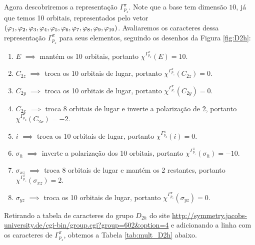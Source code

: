 \documentclass[a4paper,10pt]{article}
\newcommand{\mchi}{\chi^{\Gamma^\pi_{p_z}}}
\begin{document}
Agora descobriremos a representação $\Gamma^\pi_{p_z}$. Note que a base tem dimensão $10$, já que temos 10 orbitais, representados pelo vetor $(\varphi_1, \varphi_2, \varphi_3, \varphi_4, \varphi_5, \varphi_6, \varphi_7, \varphi_8, \varphi_9, \varphi_{10})$. Avaliaremos os caracteres dessa representação $\Gamma^\pi_{p_z}$ para seus elementos, seguindo os desenhos da Figura \ref{fig:D2h}:
\begin{enumerate}
\item $E$ $\implies$ mantém os 10 orbitais, portanto $\mchi(E) = 10$.
\item $C_{2z}$ $\implies$ troca os 10 orbitais de lugar, portanto $\mchi(C_{2z}) = 0$.
\item $C_{2y}$ $\implies$ troca os 10 orbitais de lugar, portanto $\mchi(C_{2y}) = 0$.
\item $C_{2x}$ $\implies$ troca 8 orbitais de lugar e inverte a polarização de 2, portanto $\mchi(C_{2x}) = -2$.
\item $i$ $\implies$ troca os 10 orbitais de lugar, portanto $\mchi(i) = 0$.
\item $\sigma_{h}$ $\implies$ inverte a polarização dos 10 orbitais, portanto $\mchi(\sigma_{h}) = -10$.
\item $\sigma_{xz}$ $\implies$ troca 8 orbitais de lugar e mantém os 2 restantes, portanto $\mchi(\sigma_{xz}) = 2$.
\item $\sigma_{yz}$ $\implies$ troca os 10 orbitais de lugar, portanto $\mchi(\sigma_{yz}) = 0$.
\end{enumerate}

Retirando a tabela de caracteres do grupo $D_{2h}$ do site \url{http://symmetry.jacobs-university.de/cgi-bin/group.cgi?group=602&option=4} e adicionando a linha com os caracteres de $\Gamma^\pi_{p_z}$, obtemos a Tabela \ref{tab:mult_D2h} abaixo.
\end{document}
